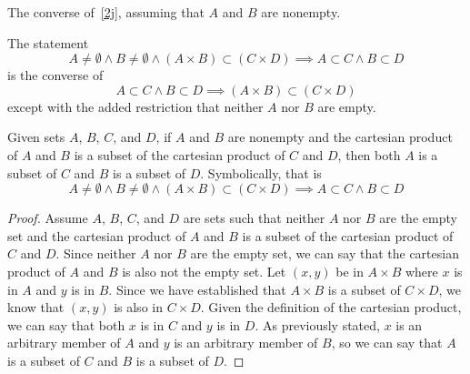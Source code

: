 \documentclass[main.tex]{subfiles}
\begin{document}
\subproblem{}\label{2l}
The converse of~\ref{2j}, assuming that \(A\) and \(B\) are nonempty.
\begin{remark}
	The statement
	\[A \neq \emptyset \land B \neq \emptyset \land (A \times B) \subset (C \times D) \implies A \subset C \land B \subset D\]
	is the converse of
	\[A \subset C \land B \subset D \implies (A \times B) \subset (C \times D)\]
	except with the added restriction that neither \(A\) nor \(B\) are empty.
\end{remark}

\begin{thm}
	Given sets \(A\), \(B\), \(C\), and \(D\), if \(A\) and \(B\) are
	nonempty and the cartesian product of \(A\) and \(B\) is a subset of the
	cartesian product of \(C\) and \(D\), then both \(A\) is a subset of \(C\)
	and \(B\) is a subset of \(D\). Symbolically, that is
	\[A \neq \emptyset \land B \neq \emptyset \land (A \times B) \subset (C \times D) \implies A \subset C \land B \subset D\]
\end{thm}
\begin{proof}
	Assume \(A\), \(B\), \(C\), and \(D\) are sets such that neither \(A\)
	nor \(B\) are the empty set and the cartesian product of \(A\) and \(B\)
	is a subset of the cartesian product of \(C\) and \(D\). Since neither
	\(A\) nor \(B\) are the empty set, we can say that the cartesian product
	of \(A\) and \(B\) is also not the empty set. Let \((x, y)\) be in
	\(A \times B\) where \(x\) is in \(A\) and \(y\) is in \(B\). Since we
	have established that \(A \times B\) is a subset of \(C \times D\), we
	know that \((x, y)\) is also in \(C \times D\). Given the definition of
	the cartesian product, we can say that both \(x\) is in \(C\) and \(y\)
	is in \(D\). As previously stated, \(x\) is an arbitrary member of \(A\)
	and \(y\) is an arbitrary member of \(B\), so we can say that \(A\) is a
	subset of \(C\) and \(B\) is a subset of \(D\).
\end{proof}
\end{document}
